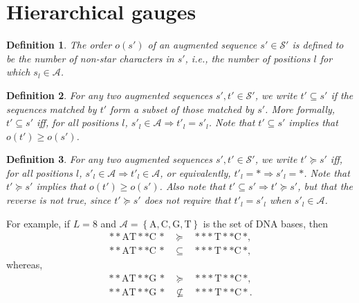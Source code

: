 \documentclass{article}
\numberwithin{myclaim}{section}
\newcommand{\set}[1]{\left\{ #1 \right\}}
\newtheorem{definition}{Definition}
\begin{document}
\section{Hierarchical gauges}

\begin{definition}
    The order $o(s')$ of an augmented sequence $s' \in \mathcal{S}'$ is defined to be the number of non-star characters in $s'$, i.e., the number of positions $l$ for which $s_l \in \mathcal{A}$.    
\end{definition}

\begin{definition}
    For any two augmented sequences $s', t' \in \mathcal{S}'$, we write $t' \subseteq s'$ if the sequences matched by $t'$ form a subset of those matched by $s'$. More formally, $t' \subseteq s'$ iff, for all positions $l$, $s'_l \in \mathcal{A} \Rightarrow t'_l = s'_l$. Note that $t' \subseteq s'$ implies that $o(t') \geq o(s')$. \label{def:augseq_subseteq}
\end{definition}

\begin{definition}
    For any two augmented sequences $s', t' \in \mathcal{S}'$, we write $t' \succeq s'$ iff, for all positions $l$, $s'_l \in \mathcal{A} \Rightarrow t'_l \in \mathcal{A}$, or equivalently, $t'_l = * \Rightarrow s'_l = *$. Note that $t' \succeq s'$ implies that $o(t') \geq o(s')$. Also note that $t' \subseteq s' \Rightarrow t' \succeq s'$, but that the reverse is not true, since $t' \succeq s'$ does not require that $t'_l = s'_l$ when $s'_l \in \mathcal{A}$. \label{def:partial_ordering}
\end{definition}

For example, if $L = 8$ and $\mathcal{A} = \set{\mathrm{A,C,G,T}}$ is the set of DNA bases, then 
\begin{eqnarray}
	* * \mathrm{A} \mathrm{T} * * \mathrm{C}\,*~ &\succeq& ~* * * \mathrm{T} * * \mathrm{C}\,*, \\
	* * \mathrm{A} \mathrm{T} * * \mathrm{C}\, *~ &\subseteq& ~* * * \mathrm{T} * * \mathrm{C}\,*,
\end{eqnarray}
whereas,
\begin{eqnarray}
	* * \mathrm{A} \mathrm{T} * * \mathrm{G}\,*~ &\succeq& ~* * * \mathrm{T} * * \mathrm{C}\,*, \\
	* * \mathrm{A} \mathrm{T} * * \mathrm{G}\,*~ &\nsubseteq& ~* * * \mathrm{T} * * \mathrm{C}*.
\end{eqnarray}
\end{document}
